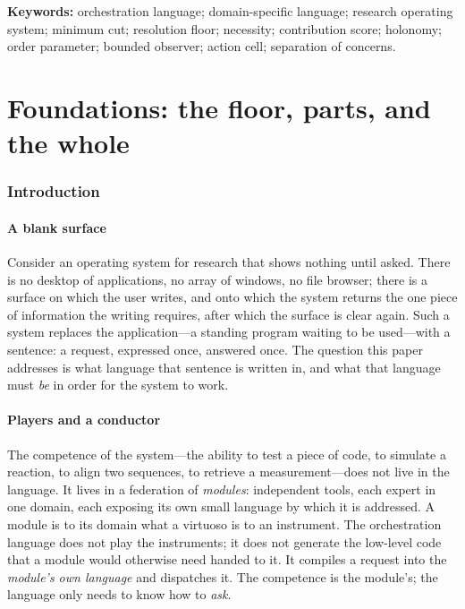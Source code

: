 \documentclass[twocolumn,11pt,a4paper]{article}
\theoremstyle{sup}
\theoremstyle{definition}
\theoremstyle{remark}
\begin{document}
\noindent\textbf{Keywords:} orchestration language; domain-specific language;
research operating system; minimum cut; resolution floor; necessity;
contribution score; holonomy; order parameter; bounded observer; action cell;
separation of concerns.

\tableofcontents

\part{Foundations: the floor, parts, and the whole}

\section{Introduction}
\label{sec:intro}

\subsection{A blank surface}

Consider an operating system for research that shows nothing until asked. There
is no desktop of applications, no array of windows, no file browser; there is a
surface on which the user writes, and onto which the system returns the one piece
of information the writing requires, after which the surface is clear again. Such
a system replaces the application---a standing program waiting to be used---with
a sentence: a request, expressed once, answered once. The question this paper
addresses is what language that sentence is written in, and what that language
must \emph{be} in order for the system to work.

\subsection{Players and a conductor}

The competence of the system---the ability to test a piece of code, to simulate a
reaction, to align two sequences, to retrieve a measurement---does not live in the
language. It lives in a federation of \emph{modules}: independent tools, each
expert in one domain, each exposing its own small language by which it is
addressed. A module is to its domain what a virtuoso is to an instrument. The
orchestration language does not play the instruments; it does not generate the
low-level code that a module would otherwise need handed to it. It compiles a
request into the \emph{module's own language} and dispatches it. The competence is
the module's; the language only needs to know how to \emph{ask}.
\end{document}
